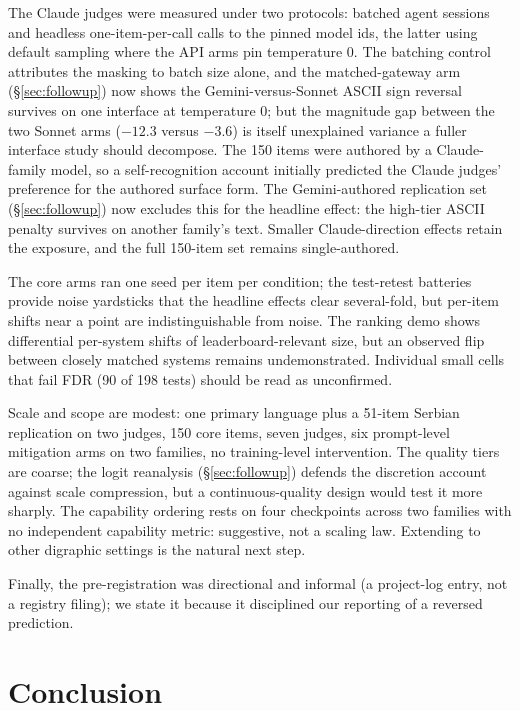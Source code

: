 The Claude judges were measured under two protocols: batched agent sessions and headless one-item-per-call calls to the pinned model ids, the latter using default sampling where the API arms pin temperature 0. The batching control attributes the masking to batch size alone, and the matched-gateway arm (\S\ref{sec:followup}) now shows the Gemini-versus-Sonnet ASCII sign reversal survives on one interface at temperature 0; but the magnitude gap between the two Sonnet arms ($-12.3$ versus $-3.6$) is itself unexplained variance a fuller interface study should decompose. The 150 items were authored by a Claude-family model, so a self-recognition account \citep{panickssery2024self} initially predicted the Claude judges' preference for the authored surface form. The Gemini-authored replication set (\S\ref{sec:followup}) now excludes this for the headline effect: the high-tier ASCII penalty survives on another family's text. Smaller Claude-direction effects retain the exposure, and the full 150-item set remains single-authored.

The core arms ran one seed per item per condition; the test-retest batteries provide noise yardsticks that the headline effects clear several-fold, but per-item shifts near a point are indistinguishable from noise. The ranking demo shows differential per-system shifts of leaderboard-relevant size, but an observed flip between closely matched systems remains undemonstrated. Individual small cells that fail FDR (90 of 198 tests) should be read as unconfirmed.

Scale and scope are modest: one primary language plus a 51-item Serbian replication on two judges, 150 core items, seven judges, six prompt-level mitigation arms on two families, no training-level intervention. The quality tiers are coarse; the logit reanalysis (\S\ref{sec:followup}) defends the discretion account against scale compression, but a continuous-quality design would test it more sharply. The capability ordering rests on four checkpoints across two families with no independent capability metric: suggestive, not a scaling law. Extending to other digraphic settings \citep{karne2026onelanguage, rajapakse2026sinhala} is the natural next step.

Finally, the pre-registration was directional and informal (a project-log entry, not a registry filing); we state it because it disciplined our reporting of a reversed prediction.

\section{Conclusion}

